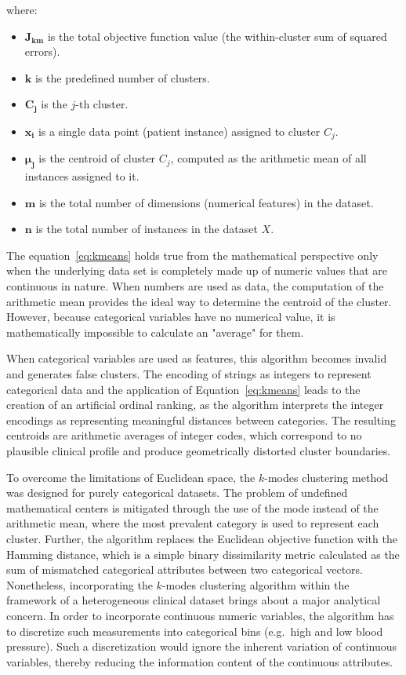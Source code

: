 where:
\begin{itemize}
    \item $\boldsymbol{J_{km}}$ is the total objective function value (the within-cluster sum of squared errors).
    \item $\boldsymbol{k}$ is the predefined number of clusters.
    \item $\boldsymbol{C_j}$ is the $j$-th cluster.
    \item $\boldsymbol{x_i}$ is a single data point (patient instance) assigned to cluster $C_j$.
    \item $\boldsymbol{\mu_j}$ is the centroid of cluster $C_j$, computed as the arithmetic mean of all instances assigned to it.
    \item $\boldsymbol{m}$ is the total number of dimensions (numerical features) in the dataset.
    \item $\boldsymbol{n}$ is the total number of instances in the dataset $X$.
\end{itemize}

\vspace{1em}

The equation~\eqref{eq:kmeans} holds true from the mathematical perspective only when the underlying data set is completely made up of numeric values that are continuous in nature. When numbers are used as data, the computation of the arithmetic mean provides the ideal way to determine the centroid of the cluster. However, because categorical variables have no numerical value, it is mathematically impossible to calculate an "average" for them.

When categorical variables are used as features, this algorithm becomes invalid and generates false clusters. The encoding of strings as integers to represent categorical data and the application of Equation~\eqref{eq:kmeans} leads to the creation of an artificial ordinal ranking, as the algorithm interprets the integer encodings as representing meaningful distances between categories. The resulting centroids are arithmetic averages of integer codes, which correspond to no plausible clinical profile and produce geometrically distorted cluster boundaries.

To overcome the limitations of Euclidean space, the $k$-modes clustering method was designed for purely categorical datasets. The problem of undefined mathematical centers is mitigated through the use of the mode instead of the arithmetic mean, where the most prevalent category is used to represent each cluster. Further, the algorithm replaces the Euclidean objective function with the Hamming distance, which is a simple binary dissimilarity metric calculated as the sum of mismatched categorical attributes between two categorical vectors. Nonetheless, incorporating the $k$-modes clustering algorithm within the framework of a heterogeneous clinical dataset brings about a major analytical concern. In order to incorporate continuous numeric variables, the algorithm has to discretize such measurements into categorical bins (e.g.\ high and low blood pressure). Such a discretization would ignore the inherent variation of continuous variables, thereby reducing the information content of the continuous attributes.

